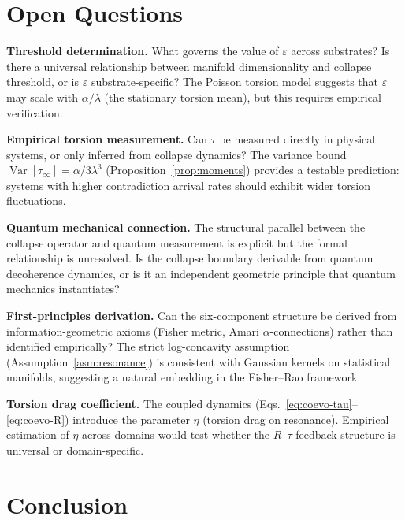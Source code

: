\documentclass[11pt]{article}
\theoremstyle{plain}
\begin{document}
\section{Open Questions}

\textbf{Threshold determination.} What governs the value of $\varepsilon$ across substrates? Is
there a universal relationship between manifold dimensionality and collapse threshold, or is
$\varepsilon$ substrate-specific? The Poisson torsion model suggests that $\varepsilon$ may scale
with $\alpha/\lambda$ (the stationary torsion mean), but this requires empirical verification.

\textbf{Empirical torsion measurement.} Can $\tau$ be measured directly in physical systems, or
only inferred from collapse dynamics? The variance bound
$\operatorname{Var}[\tau_\infty] = \alpha/3\lambda^3$ (Proposition~\ref{prop:moments}) provides a
testable prediction: systems with higher contradiction arrival rates should exhibit wider torsion
fluctuations.

\textbf{Quantum mechanical connection.} The structural parallel between the collapse operator and
quantum measurement is explicit but the formal relationship is unresolved. Is the collapse boundary
derivable from quantum decoherence dynamics, or is it an independent geometric principle that
quantum mechanics instantiates?

\textbf{First-principles derivation.} Can the six-component structure be derived from
information-geometric axioms (Fisher metric, Amari $\alpha$-connections) rather than identified
empirically? The strict log-concavity assumption (Assumption~\ref{asm:resonance}) is consistent
with Gaussian kernels on statistical manifolds, suggesting a natural embedding in the Fisher--Rao
framework.

\textbf{Torsion drag coefficient.} The coupled dynamics
(Eqs.~\eqref{eq:coevo-tau}--\eqref{eq:coevo-R}) introduce the parameter $\eta$ (torsion drag on
resonance). Empirical estimation of $\eta$ across domains would test whether the $R$--$\tau$
feedback structure is universal or domain-specific.

\section{Conclusion}
\end{document}
